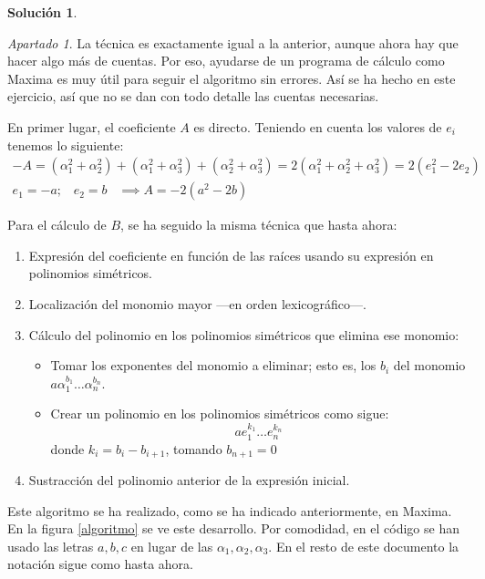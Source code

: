\documentclass[a4paper, 11pt]{article}
\theoremstyle{definition}
\newtheorem*{solucion}{Solución}
\theoremstyle{remark}
\newtheorem{apartado}{Apartado}[ejercicio]
\begin{document}
\begin{solucion}
\begin{apartado}
           La técnica es exactamente igual a la anterior, aunque ahora hay que hacer algo más de cuentas. Por eso, ayudarse de un programa de cálculo como Maxima es muy útil para seguir el algoritmo sin errores. Así se ha hecho en este ejercicio, así que no se dan con todo detalle las cuentas necesarias.

           En primer lugar, el coeficiente $A$ es directo. Teniendo en cuenta los valores de $e_i$ tenemos lo siguiente:
           \begin{align*}
               -A = (\alpha_1^2+\alpha_2^2) + (\alpha_1^2+\alpha_3^2) + (\alpha_2^2+\alpha_3^2) = 2(\alpha_1^2+\alpha_2^2+\alpha_3^2) = 2(e_1^2-2e_2)\\
               e_1 = -a; \;\;\; e_2 = b \;\;\; \implies \boxed{A = -2(a^2-2b)}
           \end{align*}

           Para el cálculo de $B$, se ha seguido la misma técnica que hasta ahora:
           \begin{enumerate}
               \item Expresión del coeficiente en función de las raíces usando su expresión en polinomios simétricos.
               \item Localización del monomio mayor ---en orden lexicográfico---.
               \item Cálculo del polinomio en los polinomios simétricos que elimina ese monomio:
               \begin{itemize}
                   \item Tomar los exponentes del monomio a eliminar; esto es, los $b_i$ del monomio $a\alpha_1^{b_1}\dots\alpha_n^{b_n}$.
                   \item Crear un polinomio en los polinomios simétricos como sigue:
                   \[ ae_1^{k_1} \dots e_n^{k_n} \]
                   donde $k_i = b_i - b_{i+1}$, tomando $b_{n+1} = 0$
               \end{itemize}
               \item Sustracción del polinomio anterior de la expresión inicial.
           \end{enumerate}

           Este algoritmo se ha realizado, como se ha indicado anteriormente, en Maxima. En la figura \ref{algoritmo} se ve este desarrollo. Por comodidad, en el código se han usado las letras $a,b,c$ en lugar de las $\alpha_1, \alpha_2, \alpha_3$. En el resto de este documento la notación sigue como hasta ahora.


\end{apartado}
\end{solucion}
\end{document}

